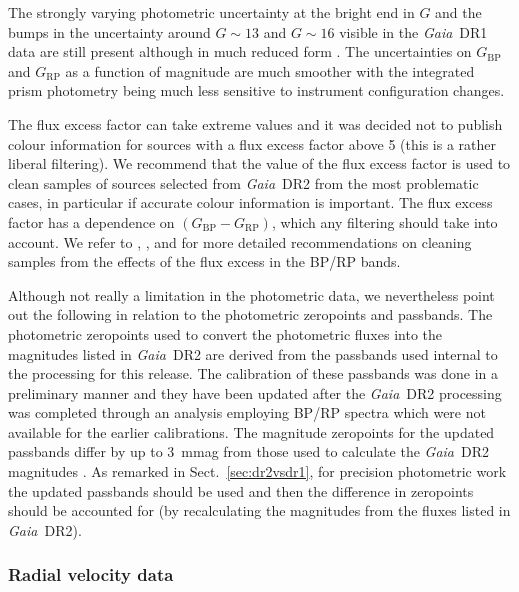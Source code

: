 \documentclass[longauth]{aa_gaia} %
\newcommand\gaia{\textit{Gaia}}
\newcommand\gdr[1]{\gaia~DR#1}
\newcommand\secref[1]{Sect.~\ref{#1}}
\newcommand\gbp{\ensuremath{G_\mathrm{BP}}}
\newcommand\grp{\ensuremath{G_\mathrm{RP}}}
\begin{document}
The strongly varying photometric uncertainty at the bright end in $G$ and the bumps in the
uncertainty around $G\sim13$ and $G\sim16$ visible in the \gdr{1} data \citep{2016A&A...595A...2G,
2017A&A...600A..51E} are still present although in much reduced form \citep{DR2-DPACP-40}. The
uncertainties on {\gbp} and {\grp} as a function of magnitude are much smoother with the integrated
prism photometry being much less sensitive to instrument configuration changes.

The flux excess factor can take extreme values and it was decided not to publish colour information
for sources with a flux excess factor above 5 (this is a rather liberal filtering).  We recommend
that the value of the flux excess factor is used to clean samples of sources selected from \gdr{2}
from the most problematic cases, in particular if accurate colour information is important. The flux
excess factor has a dependence on $(\gbp-\grp)$, which any filtering should take into account. We
refer to \cite{DR2-DPACP-40}, \cite{DR2-DPACP-31}, and \cite{DR2-DPACP-51} for more detailed
recommendations on cleaning samples from the effects of the flux excess in the BP/RP bands.

Although not really a limitation in the photometric data, we nevertheless point out the following in
relation to the photometric zeropoints and passbands. The photometric zeropoints used to convert the
photometric fluxes into the magnitudes listed in \gdr{2} are derived from the passbands used
internal to the processing for this release. The calibration of these passbands was done in a
preliminary manner and they have been updated after the \gdr{2} processing was completed through
an analysis employing BP/RP spectra which were not available for the earlier calibrations.  The
magnitude zeropoints for the updated passbands differ by up to 3~mmag from those used to calculate
the \gdr{2} magnitudes \citep{DR2-DPACP-40}. As remarked in \secref{sec:dr2vsdr1}, for precision
photometric work the updated passbands should be used and then the difference in zeropoints should
be accounted for (by recalculating the magnitudes from the fluxes listed in \gdr{2}).

\subsubsection{Radial velocity data}
\end{document}
